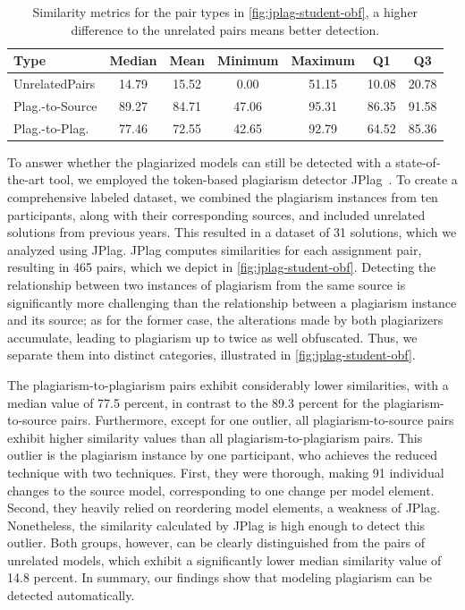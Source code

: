 \begin{table}[H]
		\centering
		\begin{tabular}{l cccccc}
			\toprule
			\textbf{Type}           & \textbf{Median} & \textbf{Mean} & \textbf{Minimum} & \textbf{Maximum} & \textbf{Q1} & \textbf{Q3} \\
			\midrule
			Unrelated\newline Pairs & 14.79        & 15.52         & 0.00         & 51.15        & 10.08       & 20.78       \\
			Plag.-to-Source         & 89.27        & 84.71         & 47.06        & 95.31        & 86.35       & 91.58       \\
			Plag.-to-Plag.          & 77.46        & 72.55         & 42.65        & 92.79        & 64.52       & 85.36       \\
			\bottomrule
		\end{tabular}
		\caption[Detecting Human Obfuscation]{Similarity metrics for the pair types in \autoref{fig:jplag-student-obf}, a higher difference to the unrelated pairs means better detection.}
		\label{tab:jplag-student-obf}
\end{table}

\noindent
To answer whether the plagiarized models can still be detected with a state-of-the-art tool, we employed the token-based plagiarism detector JPlag~\cite{prechelt2002, Saglam2022}.
To create a comprehensive labeled dataset, we combined the plagiarism instances from ten participants, along with their corresponding sources, and included unrelated solutions from previous years. This resulted in a dataset of 31 solutions, which we analyzed using JPlag.
%
JPlag computes similarities for each assignment pair, resulting in 465 pairs, which we depict in \autoref{fig:jplag-student-obf}.
Detecting the relationship between two instances of plagiarism from the same source is significantly more challenging than the relationship between a plagiarism instance and its source; as for the former case, the alterations made by both plagiarizers accumulate, leading to plagiarism up to twice as well obfuscated.
Thus, we separate them into distinct categories, illustrated in \autoref{fig:jplag-student-obf}.

The plagiarism-to-plagiarism pairs exhibit considerably lower similarities, with a median value of 77.5 percent, in contrast to the 89.3 percent for the plagiarism-to-source pairs. Furthermore, except for one outlier, all plagiarism-to-source pairs exhibit higher similarity values than all plagiarism-to-plagiarism pairs.
This outlier is the plagiarism instance by one participant, who achieves the reduced technique with two techniques. First, they were thorough, making 91 individual changes to the source model, corresponding to one change per model element. Second, they heavily relied on reordering model elements, a weakness of JPlag. Nonetheless, the similarity calculated by JPlag is high enough to detect this outlier.
%
Both groups, however, can be clearly distinguished from the pairs of unrelated models, which exhibit a significantly lower median similarity value of 14.8 percent.
In summary, our findings show that modeling plagiarism can be detected automatically.

